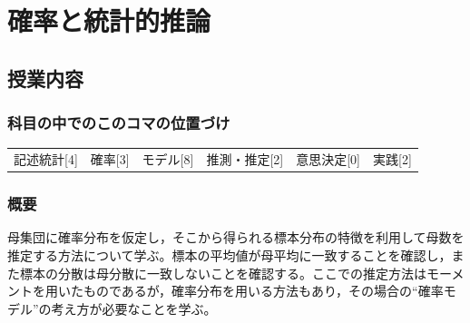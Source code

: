 \section{確率と統計的推論}
\label{lesson16}

\subsection{授業内容}
\subsubsection{科目の中でのこのコマの位置づけ}
\begin{tabular}[t]{cccccc}
    記述統計[4] & 確率[3] & モデル[8] & 推測・推定[2] & 意思決定[0] & 実践[2]
\end{tabular}
\subsubsection{概要}
母集団に確率分布を仮定し，そこから得られる標本分布の特徴を利用して母数を推定する方法について学ぶ。標本の平均値が母平均に一致することを確認し，また標本の分散は母分散に一致しないことを確認する。ここでの推定方法はモーメントを用いたものであるが，確率分布を用いる方法もあり，その場合の``確率モデル''の考え方が必要なことを学ぶ。
